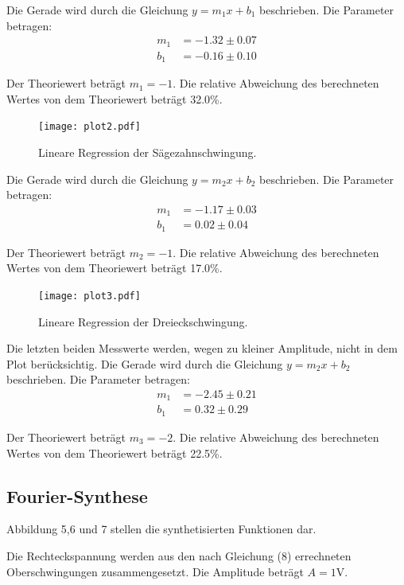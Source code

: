 Die Gerade wird durch die Gleichung $y = m_1x + b_1$ beschrieben. Die Parameter betragen:
\begin{align*}
  m_1 &= -1.32 \pm 0.07 \\
  b_1 &= -0.16 \pm 0.10
\end{align*}

Der Theoriewert beträgt $m_1=-1$. Die relative Abweichung des berechneten Wertes von dem Theoriewert beträgt 32.0\%.

\begin{figure}
  \centering
  \texttt{[image: plot2.pdf]}
  \caption{Lineare Regression der Sägezahnschwingung.}
  \label{fig:saegezahn}
\end{figure}

Die Gerade wird durch die Gleichung $y = m_2x + b_2$ beschrieben. Die Parameter betragen:
\begin{align*}
  m_1 &= -1.17 \pm 0.03 \\
  b_1 &= 0.02 \pm 0.04
\end{align*}

Der Theoriewert beträgt $m_2=-1$. Die relative Abweichung des berechneten Wertes von dem Theoriewert beträgt 17.0\%.

\begin{figure}[H]
  \centering
  \texttt{[image: plot3.pdf]}
  \caption{Lineare Regression der Dreieckschwingung.}
  \label{fig:dreieck}
\end{figure}

Die letzten beiden Messwerte werden, wegen zu kleiner Amplitude, nicht in dem Plot berücksichtig.
Die Gerade wird durch die Gleichung $y = m_2x + b_2$ beschrieben. Die Parameter betragen:
\begin{align*}
  m_1 &= -2.45 \pm 0.21 \\
  b_1 &= 0.32 \pm 0.29
\end{align*}

Der Theoriewert beträgt $m_3=-2$. Die relative Abweichung des berechneten Wertes von dem Theoriewert beträgt 22.5\%.

\subsection{Fourier-Synthese}

Abbildung 5,6 und 7 stellen die synthetisierten Funktionen dar.
\pagebreak

Die Rechteckspannung werden aus den nach Gleichung (8) errechneten Oberschwingungen zusammengesetzt.
Die Amplitude beträgt $A = 1$V.

